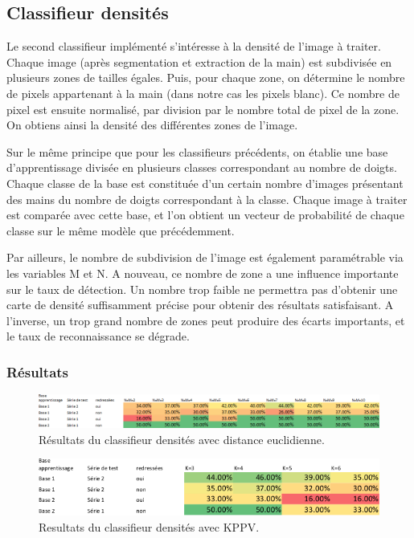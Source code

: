 \subsection{Classifieur densités}

Le second classifieur implémenté s'intéresse à la densité de l'image à traiter. Chaque image (après segmentation et extraction de la main) est subdivisée en plusieurs zones de tailles égales. Puis, pour chaque zone, on détermine le nombre de pixels appartenant à la main (dans notre cas les pixels blanc). Ce nombre de pixel est ensuite normalisé, par division par le nombre total de pixel de la zone. On obtiens ainsi la densité des différentes zones de l'image.

	Sur le même principe que pour les classifieurs précédents, on établie une base d'apprentissage divisée en plusieurs classes correspondant au nombre de doigts. Chaque classe de la base est constituée d'un certain nombre d'images présentant des mains du nombre de doigts correspondant à la classe. Chaque image à traiter est comparée avec cette base, et l'on obtient un vecteur de probabilité de chaque classe sur le même modèle que précédemment.

	Par ailleurs, le nombre de subdivision de l'image est également paramétrable via les variables M et N. A nouveau, ce nombre de zone a une influence importante sur le taux de détection. Un nombre trop faible ne permettra pas d'obtenir une carte de densité suffisamment précise pour obtenir des résultats satisfaisant. A l'inverse, un trop grand nombre de zones peut produire des écarts importants, et le taux de reconnaissance se dégrade.

\subsubsection{Résultats}
\begin{figure}[htb!]
\centerline{\includegraphics[scale=0.7]{table2.png}}
\caption{Résultats du classifieur densités avec distance euclidienne.}
\end{figure}

\begin{figure}[htb!]
\centerline{\includegraphics[scale=0.7]{table3.png}}
\caption{Resultats du classifieur densités avec KPPV.}
\end{figure}